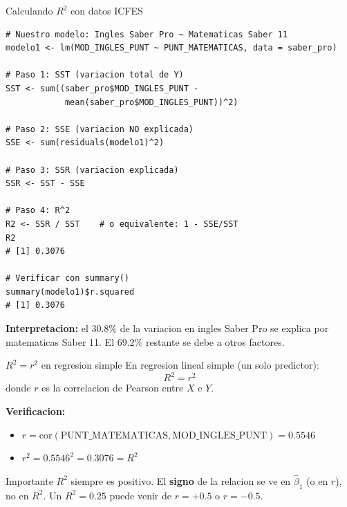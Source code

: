 \documentclass[aspectratio=169, 11pt]{beamer}
\begin{document}
\begin{frame}[fragile]{Calculando $R^2$ con datos ICFES}
\begin{lstlisting}[basicstyle=\ttfamily\scriptsize]
# Nuestro modelo: Ingles Saber Pro ~ Matematicas Saber 11
modelo1 <- lm(MOD_INGLES_PUNT ~ PUNT_MATEMATICAS, data = saber_pro)

# Paso 1: SST (variacion total de Y)
SST <- sum((saber_pro$MOD_INGLES_PUNT -
            mean(saber_pro$MOD_INGLES_PUNT))^2)

# Paso 2: SSE (variacion NO explicada)
SSE <- sum(residuals(modelo1)^2)

# Paso 3: SSR (variacion explicada)
SSR <- SST - SSE

# Paso 4: R^2
R2 <- SSR / SST    # o equivalente: 1 - SSE/SST
R2
# [1] 0.3076

# Verificar con summary()
summary(modelo1)$r.squared
# [1] 0.3076
\end{lstlisting}

\vspace{0.1cm}
\textbf{Interpretacion:} el 30.8\% de la variacion en ingles Saber Pro se explica por matematicas Saber 11. El 69.2\% restante se debe a otros factores.
\end{frame}

\begin{frame}{$R^2 = r^2$ en regresion simple}
En regresion lineal simple (un solo predictor):
\[
R^2 = r^2
\]
donde $r$ es la correlacion de Pearson entre $X$ e $Y$.

\vspace{0.3cm}
\textbf{Verificacion:}
\begin{itemize}
  \item $r = \text{cor}(\text{PUNT\_MATEMATICAS}, \text{MOD\_INGLES\_PUNT}) = 0.5546$
  \item $r^2 = 0.5546^2 = 0.3076 = R^2$ \checkmark
\end{itemize}

\vspace{0.3cm}
\begin{alertblock}{Importante}
\small $R^2$ siempre es positivo. El \textbf{signo} de la relacion se ve en $\hat{\beta}_1$ (o en $r$), no en $R^2$. Un $R^2 = 0.25$ puede venir de $r = +0.5$ o $r = -0.5$.
\end{alertblock}
\end{frame}
\end{document}
